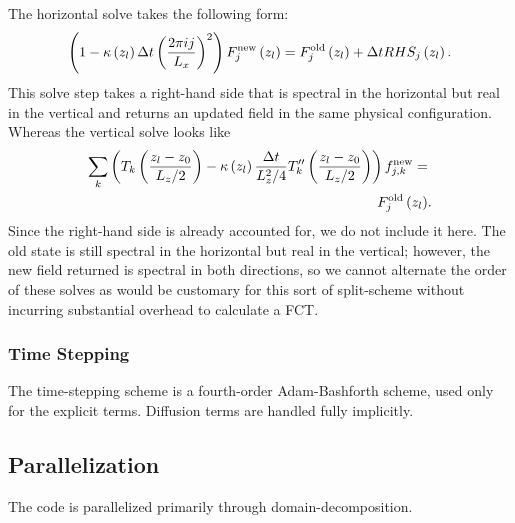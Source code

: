 		The horizontal solve takes the following form:
			\begin{equation}
				\left(1-\kappa\left(z_{l}\right)\Delta t\left(\frac{2\pi  ij}{L_{x}}\right)^{2}\right)F^{\rm{new}}_{j}\left(z_{l}\right)=F^{\rm{old}}_{j}\left(z_{l}\right)+\Delta t  RHS_{j}\left(z_{l}\right).
			\end{equation}
			This solve step takes a right-hand side that is spectral in the horizontal but real in the vertical and returns an updated field in the same physical configuration.
			Whereas the vertical solve looks like
			\begin{align}
				\sum_{k}\left(T_{k}\left(\frac{z_{l}-z_{0}}{L_{z}/2}\right)-\kappa\left(z_{l}\right)\frac{\Delta t}{L_{z}^{2}/4} T''_{k}\left(\frac{z_{l}-z_{0}}{L_{z}/2}\right)\right) f_{j,k}^{\rm{new}}=& \nonumber \\
				F_{j}^{\rm{old}}\left(z_{l}\right)&.
			\end{align}
			Since the right-hand side is already accounted for, we do not include it here.
			The old state is still spectral in the horizontal but real in the vertical; however, the new field returned is spectral in both directions, so we cannot alternate the order of these solves as would be customary for this sort of split-scheme without incurring substantial overhead to calculate a FCT.

		\subsubsection{Time Stepping} %
		\label{ssub:time_stepping}
		
			The time-stepping scheme is a fourth-order Adam-Bashforth scheme, used only for the explicit terms.
				Diffusion terms are handled fully implicitly.



	\subsection{Parallelization} %
	\label{sub:parallelization}
	
		The code is parallelized primarily through domain-decomposition.





